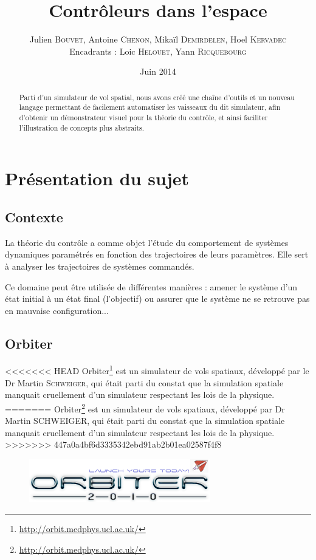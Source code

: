 \documentclass[a4paper,11pt]{article}
\title{\textbf{Contrôleurs dans l'espace}}
\author{Julien \textsc{Bouvet}, Antoine \textsc{Chenon}, Mikaïl \textsc{Demirdelen}, Hoel \textsc{Kervadec}
        \\
        Encadrants : Loic \textsc{Helouet}, Yann \textsc{Ricquebourg}}
\date{Juin 2014}
\begin{document}
\thispagestyle{empty}

\maketitle
\begin{abstract}
    Parti d'un simulateur de vol spatial, nous avons créé une chaîne d'outils et un nouveau langage permettant de facilement automatiser les vaisseaux du dit simulateur, afin d'obtenir un démonstrateur visuel pour la théorie du contrôle, et ainsi faciliter l'illustration de concepts plus abstraits.
\end{abstract}



\section{Présentation du sujet}
    \subsection{Contexte}
        La théorie du contrôle a comme objet l'étude du comportement de systèmes dynamiques paramétrés en fonction des trajectoires de leurs paramètres. Elle sert à analyser les trajectoires de systèmes commandés.

        Ce domaine peut être utilisée de différentes manières : amener le système d'un état initial à un état final (l'objectif) ou assurer que le système ne se retrouve pas en mauvaise configuration...

    \subsection{Orbiter}
<<<<<<< HEAD
        Orbiter\footnote{\url{http://orbit.medphys.ucl.ac.uk/}} est un simulateur de vols spatiaux, développé par le Dr Martin \textsc{Schweiger}, qui était parti du constat que la simulation spatiale manquait cruellement d'un simulateur respectant les lois de la physique.
=======
        Orbiter\footnote{\url{http://orbit.medphys.ucl.ac.uk/}} est un simulateur de vols spatiaux, développé par Dr Martin SCHWEIGER, qui était parti du constat que la simulation spatiale manquait cruellement d'un simulateur respectant les lois de la physique.
>>>>>>> 447a0a4bf6d3335342ebd91ab2b01ea02587f4f8

        \begin{figure}[!h]
            \begin{center}
                \includegraphics[width=0.7\textwidth]{img/orbiter_logo.png}
            \end{center}
        \end{figure}
\end{document}
